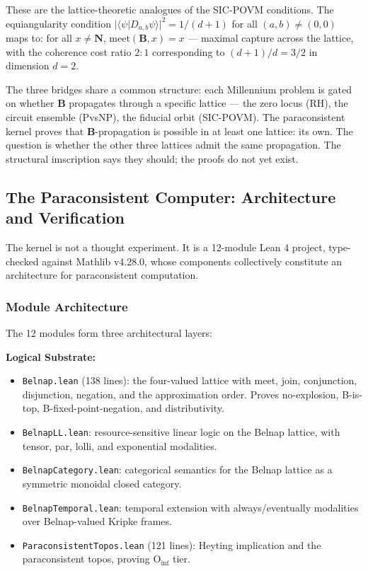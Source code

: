 \documentclass[12pt,a4paper]{article}
\begin{document}
These are the lattice-theoretic analogues of the SIC-POVM conditions. The equiangularity condition $|\langle \psi | D_{a,b} \psi \rangle|^2 = 1/(d+1)$ for all $(a,b) \neq (0,0)$ maps to: for all $x \neq \mathbf{N}$, $\text{meet}(\mathbf{B}, x) = x$ --- maximal capture across the lattice, with the coherence cost ratio $2:1$ corresponding to $(d+1)/d = 3/2$ in dimension $d=2$.

The three bridges share a common structure: each Millennium problem is gated on whether $\mathbf{B}$ propagates through a specific lattice --- the zero locus (RH), the circuit ensemble (PvsNP), the fiducial orbit (SIC-POVM). The paraconsistent kernel proves that $\mathbf{B}$-propagation is possible in at least one lattice: its own. The question is whether the other three lattices admit the same propagation. The structural imscription says they should; the proofs do not yet exist.

\subsection{The Paraconsistent Computer: Architecture and Verification}

The kernel is not a thought experiment. It is a 12-module Lean 4 project, type-checked against Mathlib v4.28.0, whose components collectively constitute an architecture for paraconsistent computation.

\subsubsection{Module Architecture}

The 12 modules form three architectural layers:

\textbf{Logical Substrate:}

\begin{itemize}
    \item \texttt{Belnap.lean} (138 lines): the four-valued lattice with meet, join, conjunction, disjunction, negation, and the approximation order. Proves no-explosion, B-is-top, B-fixed-point-negation, and distributivity.
    \item \texttt{BelnapLL.lean}: resource-sensitive linear logic on the Belnap lattice, with tensor, par, lolli, and exponential modalities.
    \item \texttt{BelnapCategory.lean}: categorical semantics for the Belnap lattice as a symmetric monoidal closed category.
    \item \texttt{BelnapTemporal.lean}: temporal extension with always/eventually modalities over Belnap-valued Kripke frames.
    \item \texttt{ParaconsistentTopos.lean} (121 lines): Heyting implication and the paraconsistent topos, proving $\text{O}_{\text{inf}}$ tier.
\end{itemize}
\end{document}
